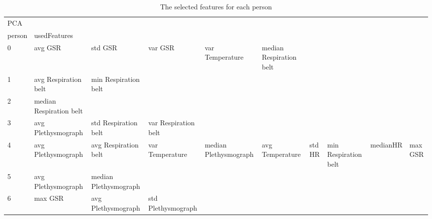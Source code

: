 \begin{landscape}
\begin{table}[]
\centering
\caption{The selected features for each person}
\begin{tabular}{l|llllllll}
PCA      &                         &                       &                         &                         &                         &                       &                      &          &                      &        \\
person   & usedFeatures            &                       &                         &                         &                         &                       &                      &          &                      &        \\
0        & avg GSR                 & std GSR               & var GSR                 & var Temperature         & median Respiration belt &                       &                      &          &                      &        \\
1        & avg Respiration belt    & min Respiration belt  &                         &                         &                         &                       &                      &          &                      &        \\
2        & median Respiration belt &                       &                         &                         &                         &                       &                      &          &                      &        \\
3        & avg Plethysmograph      & std Respiration belt  & var Respiration belt    &                         &                         &                       &                      &          &                      &        \\
4        & avg Plethysmograph      & avg Respiration belt  & var Temperature         & median Plethysmograph   & avg Temperature         & std HR                & min Respiration belt & medianHR & max GSR              &        \\
5        & avg Plethysmograph      & median Plethysmograph &                         &                         &                         &                       &                      &          &                      &        \\
6        & max GSR                 & avg Plethysmograph    & std Plethysmograph      &                         &                         &                       &                      &          &                      &        \\

\end{tabular}
\end{table}
\end{landscape}
